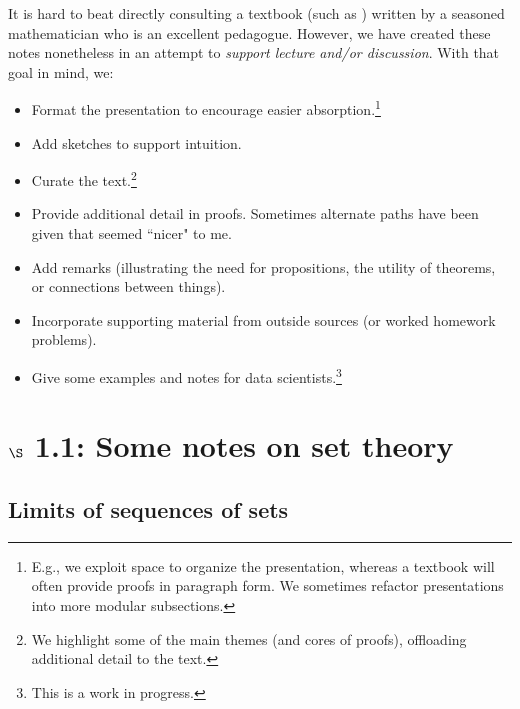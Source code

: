 \documentclass{article} %
\begin{document}
It is hard to beat directly consulting a textbook (such as \cite{ash2000probability}) written by a seasoned mathematician who is an excellent pedagogue. However, we have created these notes nonetheless in an attempt to \textit{support lecture and/or discussion}.   With that goal in mind, we:
\begin{itemize}
\item Format the presentation to encourage easier absorption.\footnote{E.g., we exploit space to organize the presentation, whereas a textbook will often provide proofs in paragraph form. We sometimes refactor presentations into more modular subsections.}
\item Add sketches to support intuition.
\item Curate the text.\footnote{We highlight some of the main themes (and cores of proofs), offloading additional detail to the text.} 
\item Provide additional detail in proofs.  Sometimes alternate paths have been given that seemed ``nicer" to me. 
\item Add remarks (illustrating the need for propositions, the utility of theorems, or connections between things).
\item Incorporate supporting material from outside sources (or worked homework problems).
\item Give some examples and notes for data scientists.\footnote{This is a work in progress.}
\end{itemize}





\section{$\S$ 1.1: Some notes on set theory}

\subsection{Limits of sequences of sets}
\end{document}
